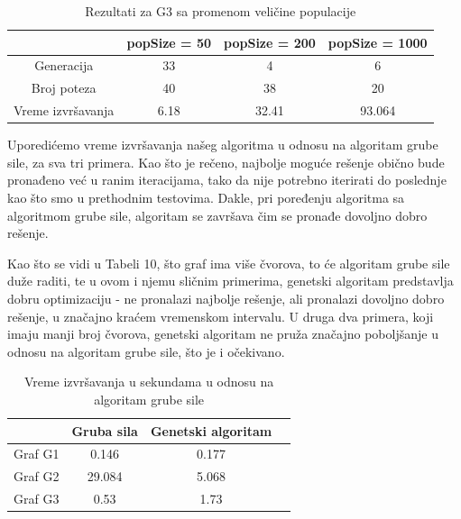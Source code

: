 \documentclass[12pt]{article}
\begin{document}
\begin {table}[H]
\begin{center}
\caption {Rezultati za G3 sa promenom veličine populacije} \label{tab:title} 
\begin{tabular}{|| c|c c c||} 	
	\hline
	& popSize = 50 & popSize = 200 & popSize = 1000 \\ 
	\hline\hline
	Generacija & 33 & 4 & 6 \\ 
	\hline
	Broj poteza & 40 & 38 & 20 \\
	\hline
	Vreme izvršavanja & 6.18 & 32.41 & 93.064 \\
	\hline
\end{tabular}
\end{center}
\end{table}
		
		
\vspace*{2\baselineskip}
Uporedićemo vreme izvršavanja našeg algoritma u odnosu na algoritam grube sile, za sva tri primera. Kao što je rečeno, najbolje moguće rešenje obično bude pronađeno već u ranim iteracijama, tako da nije potrebno iterirati do poslednje kao što smo u prethodnim testovima. Dakle, pri poređenju algoritma sa algoritmom grube sile, algoritam se završava čim se pronađe dovoljno dobro rešenje.
	\par Kao što se vidi u Tabeli 10, što graf ima više čvorova, to će algoritam grube sile duže raditi, te u ovom i njemu sličnim primerima, genetski algoritam predstavlja dobru optimizaciju - ne pronalazi najbolje rešenje, ali pronalazi dovoljno dobro rešenje, u značajno kraćem vremenskom intervalu. U druga dva primera, koji imaju manji broj čvorova, genetski algoritam ne pruža značajno poboljšanje u odnosu na algoritam grube sile, što je i očekivano. 

	\begin {table}[H]
\begin{center}
	\caption {Vreme izvršavanja u sekundama u odnosu na algoritam grube sile} \label{tab:title} 
	\begin{tabular}{|| c|c c c||} 	
		\hline
		& Gruba sila & Genetski algoritam & \\ 
		\hline\hline
		Graf G1 &  0.146 & 0.177 & \\ 
		\hline
		Graf G2 & 29.084 & 5.068 & \\
		\hline
		Graf G3 & 0.53 & 1.73 & \\
		\hline
	\end{tabular}
\end{center}
\end{table}
\end{document}
